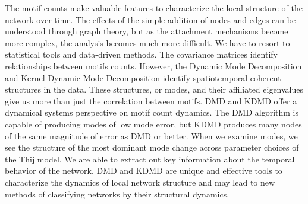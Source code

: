 The motif counts make valuable features to characterize the local structure 
of the network over time. The effects of the simple addition of nodes and edges can be understood through graph theory, but as
the attachment mechanisms become more complex, the analysis becomes much more
difficult. We have to resort to statistical tools and data-driven methods. The
covariance matrices identify relationships between motifs counts. However,
the Dynamic Mode Decomposition and Kernel Dynamic Mode Decomposition identify spatiotemporal 
coherent structures in the data. These structures, or modes, and their affiliated eigenvalues
give us more than just the correlation between motifs. DMD and KDMD
 offer a dynamical systems perspective on motif count dynamics. The DMD 
 algorithm is capable of producing modes of low mode error, but KDMD 
 produces many nodes of the same magnitude of error as DMD or better. When we examine 
 modes, we see the structure of the most dominant mode change across parameter choices 
 of the Thij model. We are able to extract out key information about the temporal behavior of the network.
 DMD and KDMD are unique and effective tools to characterize the dynamics of local network structure and may
 lead to new methods of classifying networks by their structural dynamics.
